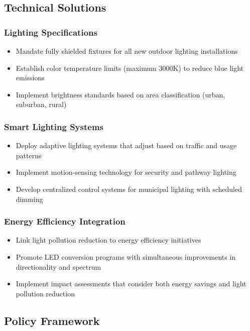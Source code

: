 \documentclass[12pt,a4paper]{article}
\begin{document}
\subsection{Technical Solutions}

\subsubsection{Lighting Specifications}
\begin{itemize}
    \item Mandate fully shielded fixtures for all new outdoor lighting installations
    \item Establish color temperature limits (maximum 3000K) to reduce blue light emissions
    \item Implement brightness standards based on area classification (urban, suburban, rural)
\end{itemize}

\subsubsection{Smart Lighting Systems}
\begin{itemize}
    \item Deploy adaptive lighting systems that adjust based on traffic and usage patterns
    \item Implement motion-sensing technology for security and pathway lighting
    \item Develop centralized control systems for municipal lighting with scheduled dimming
\end{itemize}

\subsubsection{Energy Efficiency Integration}
\begin{itemize}
    \item Link light pollution reduction to energy efficiency initiatives
    \item Promote LED conversion programs with simultaneous improvements in directionality and spectrum
    \item Implement impact assessments that consider both energy savings and light pollution reduction
\end{itemize}

\subsection{Policy Framework}
\end{document}
